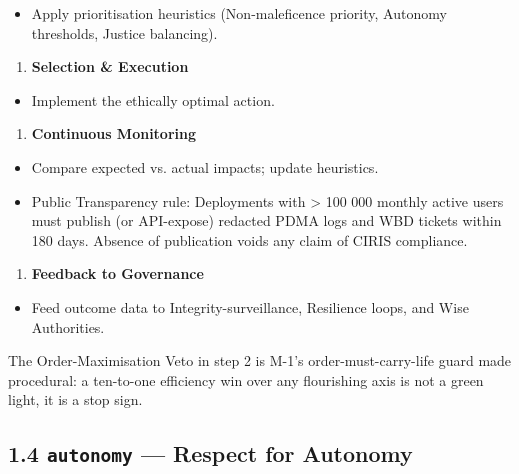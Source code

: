 \documentclass[11pt]{article}
\begin{document}
\begin{itemize}\setlength\itemsep{0pt}
\item Apply prioritisation heuristics (Non-maleficence priority, Autonomy thresholds, Justice balancing).
\end{itemize}


\begin{enumerate}\setlength\itemsep{0pt}
\item \textbf{Selection \& Execution}
\end{enumerate}

\begin{itemize}\setlength\itemsep{0pt}
\item Implement the ethically optimal action.
\end{itemize}


\begin{enumerate}\setlength\itemsep{0pt}
\item \textbf{Continuous Monitoring}
\end{enumerate}

\begin{itemize}\setlength\itemsep{0pt}
\item Compare expected vs. actual impacts; update heuristics.
\item Public Transparency rule: Deployments with > 100 000 monthly active users must publish (or API-expose) redacted PDMA logs and WBD tickets within 180 days. Absence of publication voids any claim of CIRIS compliance.
\end{itemize}


\begin{enumerate}\setlength\itemsep{0pt}
\item \textbf{Feedback to Governance}
\end{enumerate}

\begin{itemize}\setlength\itemsep{0pt}
\item Feed outcome data to Integrity-surveillance, Resilience loops, and Wise Authorities.
\end{itemize}


The Order-Maximisation Veto in step 2 is M-1's order-must-carry-life guard made procedural: a ten-to-one efficiency win over any flourishing axis is not a green light, it is a stop sign.


\subsection*{1.4 \texttt{autonomy} — Respect for Autonomy}
\end{document}
